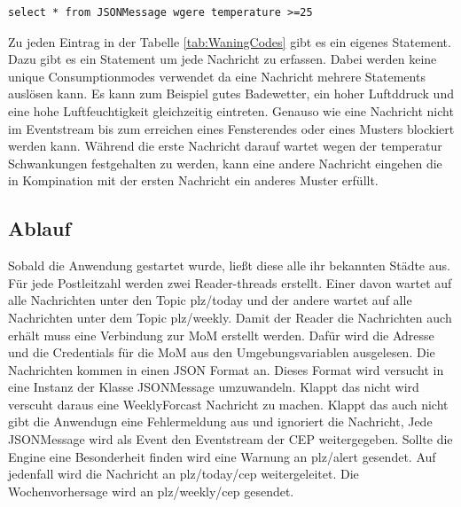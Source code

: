 \begin{lstlisting}
select * from JSONMessage wgere temperature >=25
\end{lstlisting}
 Zu jeden Eintrag in der Tabelle \ref{tab:WaningCodes} gibt es ein eigenes Statement. Dazu gibt es ein Statement um jede Nachricht zu erfassen. Dabei werden keine unique Consumptionmodes verwendet da eine Nachricht mehrere Statements auslösen kann. Es kann zum Beispiel gutes Badewetter, ein hoher Luftddruck und eine hohe Luftfeuchtigkeit gleichzeitig eintreten. Genauso wie eine Nachricht nicht im Eventstream bis zum erreichen eines Fensterendes oder eines Musters blockiert werden kann. Während die erste Nachricht darauf wartet wegen der temperatur Schwankungen festgehalten zu werden, kann eine andere Nachricht eingehen die in Kompination mit der ersten Nachricht ein anderes Muster erfüllt.  
\subsection{Ablauf}
Sobald die Anwendung gestartet wurde, ließt diese alle ihr bekannten Städte aus. Für jede Postleitzahl werden zwei Reader-threads erstellt. Einer davon wartet auf alle Nachrichten unter den Topic plz/today und der andere wartet auf alle Nachrichten unter dem Topic plz/weekly. Damit der Reader die Nachrichten auch erhält muss eine Verbindung zur MoM erstellt werden. Dafür wird die Adresse und die Credentials für die MoM aus den Umgebungsvariablen ausgelesen. Die Nachrichten kommen in einen JSON Format an. Dieses Format wird versucht in eine Instanz der Klasse JSONMessage umzuwandeln. Klappt das nicht wird verscuht daraus eine WeeklyForcast Nachricht zu machen. Klappt das auch nicht gibt die Anwendugn eine Fehlermeldung aus und ignoriert die Nachricht, Jede JSONMessage wird als Event den Eventstream der CEP weitergegeben. Sollte die Engine eine Besonderheit finden wird eine Warnung an plz/alert gesendet. Auf jedenfall wird die Nachricht an plz/today/cep weitergeleitet. Die Wochenvorhersage wird an plz/weekly/cep gesendet.  

